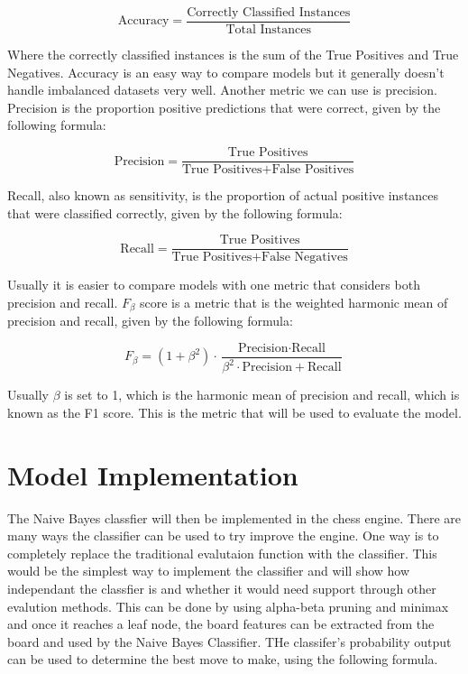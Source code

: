 \begin{equation}
    \label{eq:accuracy}
    \text{Accuracy} = \frac{\text{Correctly Classified Instances}}{\text{Total Instances}}
\end{equation}

Where the correctly classified instances is the sum of the True Positives and True Negatives. Accuracy is an easy way to compare models but it generally doesn't handle imbalanced datasets very well. Another metric we can use is precision. Precision is the proportion positive predictions that were correct, given by the following formula:

\begin{equation}
    \label{eq:precision}
    \text{Precision} = \frac{\text{True Positives}}{\text{True Positives} + \text{False Positives}}
\end{equation}

Recall, also known as sensitivity, is the proportion of actual positive instances that were classified correctly, given by the following formula:

\begin{equation}
    \label{eq:recall}
    \text{Recall} = \frac{\text{True Positives}}{\text{True Positives} + \text{False Negatives}}
\end{equation}

Usually it is easier to compare models with one metric that considers both precision and recall. $F_{\beta}$ score is a metric that is the weighted harmonic mean of precision and recall, given by the following formula:

\begin{equation}
    \label{eq:f1}
    F_{\beta} = (1 + \beta^2) \cdot \frac{\text{Precision} \cdot \text{Recall}}{\beta^2 \cdot \text{Precision} + \text{Recall}}
\end{equation}

Usually $\beta$ is set to 1, which is the harmonic mean of precision and recall, which is known as the F1 score. This is the metric that will be used to evaluate the model.


\section{Model Implementation}

The Naive Bayes classfier will then be implemented in the chess engine. There are many ways the classifier can be used to try improve the engine. One way is to completely replace the traditional evalutaion function with the classifier. This would be the simplest way to implement the classifier and will show how independant the classfier is and whether it would need support through other evalution methods. This can be done by using alpha-beta pruning and minimax and once it reaches a leaf node, the board features can be extracted from the board and used by the Naive Bayes Classifier. THe classifer's probability output can be used to determine the best move to make, using the following formula.


